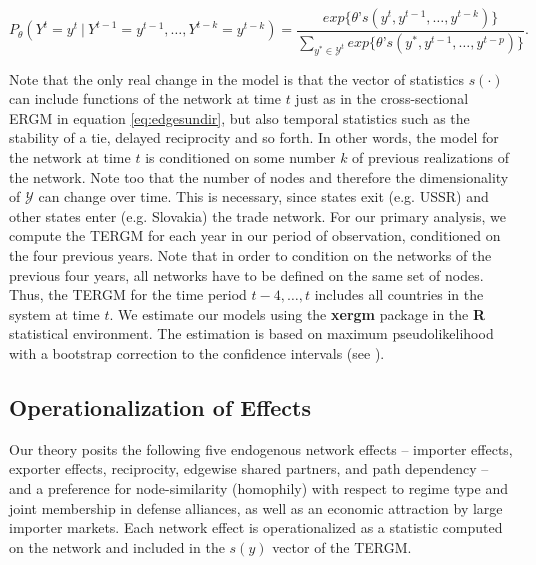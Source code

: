\documentclass[12pt, letterpaper]{article}
\numberwithin{equation}{section}
\begin{document}
\begin{footnotesize}
\begin{equation*}
P_{\theta}(Y^t=y^t~| ~Y^{t-1}=y^{t-1}, \dots , Y^{t-k}=y^{t-k} )= \frac{exp\bigl\{\theta’s(y^t, y^{t-1}, \dots , y^{t-k})\bigl\}}{\sum_{y^* \in \mathcal{Y}^t }exp\bigl\{\theta’s(y^*, y^{t-1}, \dots , y^{t-p})\bigl\}}.
\end{equation*}
\end{footnotesize}

\noindent Note that the only real change in the model is that the vector of statistics $s(\cdot )$ can include functions of the network at time $t$ just as in the cross-sectional ERGM in equation \eqref{eq:edgesundir}, but also temporal statistics such as the stability of a tie, delayed reciprocity and so forth. 
In other words, the model for the network at time $t$ is conditioned on some number $k$ of previous realizations of the network. 
Note too that the number of nodes and therefore the dimensionality of $\mathcal{Y}$ can change over time. 
This is necessary, since states exit (e.g. USSR) and other states enter (e.g. Slovakia) the trade network.
For our primary analysis, we compute the TERGM for each year in our period of observation, conditioned on the four previous years. 
Note that in order to condition on the networks of the previous four years, all networks have to be defined on the same set of nodes. 
Thus, the TERGM for the time period $t-4,\dots , t$ includes all countries in the system at time $t$. 
We estimate our models using the \textbf{xergm} \citep{Rxergm} package in the \textbf{R} statistical environment. The estimation is based on maximum pseudolikelihood with a bootstrap correction to the confidence intervals (see \cite{LeiCraDes:17}).


 
 
\subsection{Operationalization of Effects}\label{one} %

Our theory posits the following five endogenous network effects -- importer effects, exporter effects, reciprocity, edgewise shared partners, and path dependency -- and a preference for node-similarity (homophily) with respect to regime type and joint membership in defense alliances, as well as an economic attraction by large importer markets. Each network effect is operationalized as a statistic computed on the network and included in the $s(y)$ vector of the TERGM. 
\end{document}
